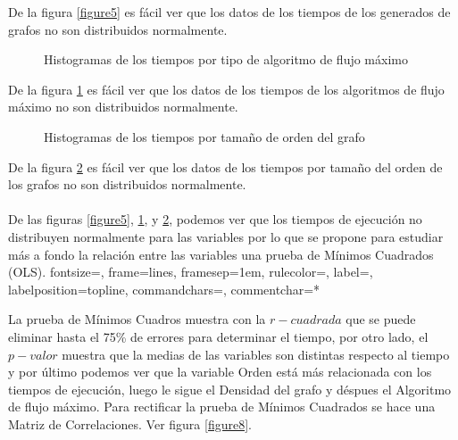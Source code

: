 \documentclass[a4paper, 11pt]{article}
\begin{document}
De la figura \ref{figure5} es fácil ver que los datos de los tiempos de los generados de grafos no son distribuidos normalmente.


\begin{figure}[H]
\centering
{}
\caption{Histogramas de los tiempos por tipo de algoritmo de flujo máximo} \label{figure6}
\end{figure}

De la figura \ref{figure6} es fácil ver que los datos de los tiempos de los algoritmos de flujo máximo no son distribuidos normalmente.


\begin{figure}[H]
\centering
{}
\caption{Histogramas de los tiempos por tamaño de orden del grafo} \label{figure7}
\end{figure}

De la figura \ref{figure7} es fácil ver que los datos de los tiempos por tamaño del orden de los grafos no son distribuidos normalmente.
\\
\\
De las figuras \ref{figure5}, \ref{figure6}, y \ref{figure7}, podemos ver que los tiempos de ejecución no distribuyen normalmente para las variables por lo que se propone para estudiar más a fondo la relación entre las variables una prueba de Mínimos Cuadrados (OLS).
\newpage
{}
{fontsize=\footnotesize,
 frame=lines,
 framesep=1em, 
 rulecolor=\color{Gray},
 label=,
 labelposition=topline,
 commandchars=\|\(\),
 commentchar=*  
}

La prueba de Mínimos Cuadros muestra con la $r-cuadrada$ que se puede eliminar hasta el 75\% de errores para determinar el tiempo, por otro lado, el $p-valor$ muestra que la medias de las variables son distintas respecto al tiempo y por último podemos ver que la variable Orden está más relacionada con los tiempos de ejecución, luego le sigue el Densidad del grafo y déspues el Algoritmo de flujo máximo. Para rectificar la prueba de Mínimos Cuadrados se hace una Matriz de Correlaciones. Ver figura \ref{figure8}.
\end{document}
